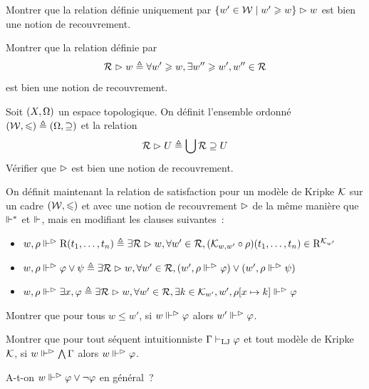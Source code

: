 \begin{problem}
  \begin{pbQuest}
  \item Montrer que la relation définie uniquement par
    $\left\{ w'\in\mathcal{W} \;\middle\vert\; w'\geqslant w \right\}\mathrel{\rhd} w$ est bien une notion de
    recouvrement.
  \item Montrer que la relation définie par
    \[\mathcal R\mathrel{\rhd} w \triangleq \forall w' \geqslant w, \exists w'' \geqslant w',
    w'' \in \mathcal R\]
    est bien une notion de recouvrement.
  \item Soit $(X,\Omega)$ un espace topologique. On définit l'ensemble ordonné
    $(\mathcal{W},\leqslant)\triangleq (\Omega,\supseteq)$ et la relation
    \[\mathcal R \mathrel{\rhd} U \triangleq \bigcup \mathcal R \supseteq U \]
    Vérifier que $\mathrel{\rhd}$ est bien une notion de recouvrement.
  \end{pbQuest}
  On définit maintenant la relation de satisfaction pour un modèle de Kripke
  $\mathcal{K}$ sur un cadre $(\mathcal{W},\leqslant)$ et avec une notion de recouvrement
  $\mathrel{\rhd}$ de la même manière que $\Vdash^*$ et $\Vdash$, mais en modifiant les
  clauses suivantes~:
  \begin{itemize}
  \item $w,\rho\Vdash^{\mathrel{\rhd}}\mathrm{R}(t_1,\ldots,t_n) \triangleq
    \exists \mathcal R\mathrel{\rhd} w, \forall w' \in \mathcal R,
    (\mathcal{K}_{w,w'}\circ \rho)(t_1,\ldots,t_n) \in\mathrm{R}^{\mathcal{K}_{w'}}$
  \item $w,\rho\Vdash^{\mathrel{\rhd}} \varphi \lor \psi \triangleq
    \exists \mathcal R\mathrel{\rhd} w, \forall w' \in \mathcal R,
    (w',\rho\Vdash^{\mathrel{\rhd}} \varphi) \lor (w',\rho\Vdash^{\mathrel{\rhd}}\psi)$
  \item $w,\rho\Vdash^{\mathrel{\rhd}}\exists x, \varphi \triangleq
    \exists \mathcal R\mathrel{\rhd} w, \forall w' \in \mathcal R,
    \exists k \in \mathcal{K}_{w'}, w',\rho[x\mapsto k]\Vdash^{\mathrel{\rhd}}\varphi$
  \end{itemize}
  \begin{pbQuest}[resume]
  \item Montrer que pour tous $w\leq w'$, si $w\Vdash^{\mathrel{\rhd}}\varphi$ alors
    $w'\Vdash^{\mathrel{\rhd}}\varphi$.
  \item Montrer que pour tout séquent intuitionniste $\Gamma\vdash_{\operatorname{LJ}}\varphi$ et
    tout modèle de Kripke $\mathcal{K}$, si
    $w\Vdash^{\mathrel{\rhd}}\bigwedge\Gamma$ alors $w\Vdash^{\mathrel{\rhd}}\varphi$.
  \item A-t-on $w\Vdash^{\mathrel{\rhd}}\varphi\lor\lnot\varphi$ en général~?
  \end{pbQuest}
\end{problem}
